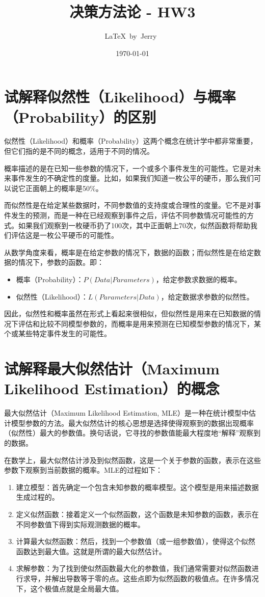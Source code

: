 \documentclass[]{article}
\title{决策方法论 - HW3}
\author{\LaTeX\ by\ Jerry\ }
\date{\today}
\begin{document}
\fancyfoot[C]{\thepage}

\section{试解释似然性（Likelihood）与概率（Probability）的区别}

似然性（Likelihood）和概率（Probability）这两个概念在统计学中都非常重要，但它们指的是不同的概念，适用于不同的情况。

概率描述的是在已知一些参数的情况下，一个或多个事件发生的可能性。它是对未来事件发生的不确定性的度量。比如，如果我们知道一枚公平的硬币，那么我们可以说它正面朝上的概率是50\%。

而似然性是在给定某些数据时，不同参数值的支持度或合理性的度量。它不是对事件发生的预测，而是一种在已经观察到事件之后，评估不同参数情况可能性的方式。如果我们观察到一枚硬币扔了100次，其中正面朝上70次，似然函数将帮助我们评估这是一枚公平硬币的可能性。

从数学角度来看，概率是在给定参数的情况下，数据的函数；而似然性是在给定数据的情况下，参数的函数。即：

\begin{itemize}
    \item 概率（Probability）：$P(Data | Parameters)$，给定参数求数据的概率。
    \item 似然性（Likelihood）：$L(Parameters | Data)$，给定数据求参数的似然性。
\end{itemize}

因此，似然性和概率虽然在形式上看起来很相似，但似然性是用来在已知数据的情况下评估和比较不同模型参数的，而概率是用来预测在已知模型参数的情况下，某个或某些特定事件发生的可能性。

\section{试解释最大似然估计（Maximum Likelihood Estimation）的概念}

最大似然估计（Maximum Likelihood Estimation, MLE）是一种在统计模型中估计模型参数的方法。最大似然估计的核心思想是选择使得观察到的数据出现概率（似然性）最大的参数值。换句话说，它寻找的参数值能最大程度地“解释”观察到的数据。

在数学上，最大似然估计涉及到似然函数，这是一个关于参数的函数，表示在这些参数下观察到当前数据的概率。MLE的过程如下：

\begin{enumerate}
    \item 建立模型：首先确定一个包含未知参数的概率模型。这个模型是用来描述数据生成过程的。
    \item 定义似然函数：接着定义一个似然函数，这个函数是未知参数的函数，表示在不同参数值下得到实际观测数据的概率。
    \item 计算最大似然函数：然后，找到一个参数值（或一组参数值），使得这个似然函数达到最大值。这就是所谓的最大似然估计。
    \item 求解参数：为了找到使似然函数最大化的参数值，我们通常需要对似然函数进行求导，并解出导数等于零的点。这些点即为似然函数的极值点。在许多情况下，这个极值点就是全局最大值。
\end{enumerate}
\end{document}
